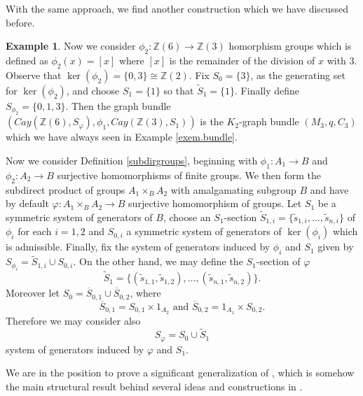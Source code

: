 \documentclass{amsart}
\theoremstyle{definition}
\newtheorem{example}[theo]{Example}
\numberwithin{equation}{section}
\begin{document}
With the same approach, we find another construction which we have discussed before.


\begin{example}\label{exem.due}
Now we consider $\phi_2: \mathbb{Z}(6) \longrightarrow \mathbb{Z}(3)$ homorphism groups which is defined as $\phi_2(x)= [x]$ where $[x]$ is the remainder of the division of $x$ with $3$. Observe that $\ker(\phi_2) = \{0,3\} \cong \mathbb{Z}(2)$. Fix $S_0=\{3\}$, as the generating set for $\ker(\phi_2)$, and choose $S_1=\{1\}$ so that $\widetilde{S}_1 = \{1\}$. Finally define $S_{\phi_2} = \{0,1,3\}$. Then the graph bundle $(Cay(\mathbb{Z}(6), S_{\varphi}), \phi_1, Cay(\mathbb{Z}(3), S_1))$ is the $K_2$-graph bundle $(M_3, q, C_3)$ which we have always seen in Example \ref{exem.bundle}.
\end{example}


Now we consider Definition \ref{subdirgroups}, beginning with $\phi_1: A_1 \longrightarrow B$ and $\phi_2: A_2 \longrightarrow B$  surjective homomorphisms of finite groups. We then form the subdirect product of groups $A_1 \times_{B} A_2$ with amalgamating subgroup $B$ and have by default $\varphi: A_1 \times_{B} A_2 \longrightarrow B$  surjective homomorphism of groups. Let $S_1$ be a symmetric system of generators of $B$, choose an $S_1$-section $\widetilde{S}_{1,i} = \{\widetilde{s}_{1,i}, \dots, \widetilde{s}_{n,i}\}$ of $\phi_i$ for each $i=1,2$ and  $S_{0,i}$ a symmetric system of generators of $\ker(\phi_i)$ which is admissible. Finally, fix the system of generators induced by $\phi_i$ and $S_1$ given by $S_{\phi_i} = \widetilde{S}_{1,i} \cup S_{0,i}$. On the other hand, we may define the $S_1$-section of $\varphi$
\begin{equation}\label{instrumental1}
\widetilde{S}_1 = \{(\widetilde{s}_{1,1},\widetilde{s}_{1,2}), \dots, (\widetilde{s}_{n,1},\widetilde{s}_{n,2})\}.
\end{equation}
Moreover let $S_0 = \overline{S}_{0,1} \cup \overline{S}_{0,2}$, where 
\begin{equation}\label{instrumental2}
\overline{S}_{0,1} = S_{0,1} \times {1_{A_2}} \mbox{ and } \overline{S}_{0,2} = {1_{A_1}} \times S_{0,2}. 
\end{equation}
Therefore we may consider also \begin{equation}\label{instrumental3}
S_{\varphi}=S_0 \cup \widetilde{S}_1
\end{equation}  system of generators induced by $\varphi$ and $S_1$.

We are in the position to prove a significant generalization of \cite[Theorem 3.6]{bddr}, which is somehow the main structural result behind several ideas and constructions  in \cite{bbr1,  b, bddr}.
\end{document}
